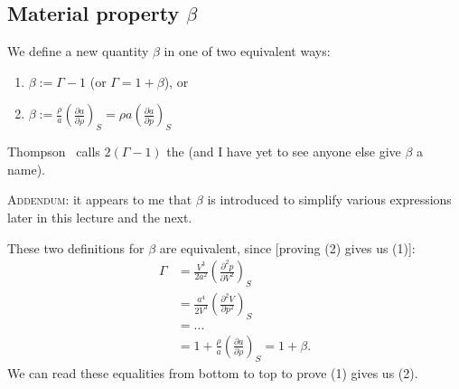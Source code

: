 \subsection{Material property $\beta$}

\begin{definition}
We define a new quantity $\beta$ in one of two equivalent ways:
\begin{enumerate}
\item $\beta :=\Gamma-1$ (or $\Gamma = 1+\beta$), or
\item $\displaystyle{\beta:=\frac{\rho}{a}\left(\frac{\partial a}{\partial\rho}\right)_{S}=\rho a\left(\frac{\partial a}{\partial p}\right)_{S}}$
\end{enumerate}
Thompson~\cite[p.1849~\S VII]{thompson1971fundamental} calls $2(\Gamma-1)$ the
 (and I have yet to see anyone else
give $\beta$ a name).

\textsc{Addendum}: it appears to me that $\beta$ is introduced to
simplify various expressions later in this lecture and the next.
\end{definition}

\begin{node}
These two definitions for $\beta$ are equivalent, since [proving (2)
  gives us (1)]:
\begin{subequations}
  \begin{align}
\Gamma &= \frac{V^{3}}{2a^{2}}\left(\frac{\partial^{2}p}{\partial V^{2}}\right)_{S}\\
&= \frac{a^{4}}{2V^{3}}\left(\frac{\partial^{2}V}{\partial p^{2}}\right)_{S}\\
&= \dots\\
&= 1 + \frac{\rho}{a}\left(\frac{\partial a}{\partial \rho}\right)_{S}=1+\beta.
  \end{align}
\end{subequations}
We can read these equalities from bottom to top to prove (1) gives us (2).
\end{node}

